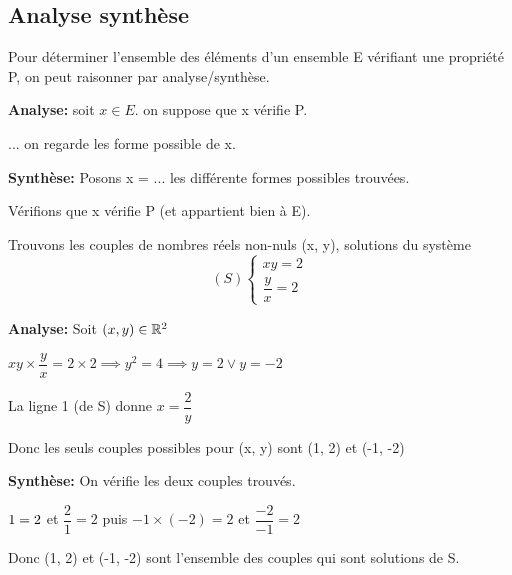 \documentclass[a4paper, 12pt]{article}
\begin{document}
\subsection{Analyse synthèse}

\begin{methode}
    Pour déterminer l'ensemble des éléments d'un ensemble E vérifiant une propriété P, on peut raisonner par analyse/synthèse.

    \vspace{1em}

    \item \textbf{Analyse:} soit $x \in E$. on suppose que x vérifie P.
    \item ... on regarde les forme possible de x.
    \item \textbf{Synthèse:} Posons x = ... les différente formes possibles trouvées.
    \item Vérifions que x vérifie P (et appartient bien à E).
\end{methode}

\begin{example}
    Trouvons les couples de nombres réels non-nuls (x, y), solutions du système
    \begin{equation*}
        (S)
        \begin{cases}
            xy = 2\\
            \dfrac{y}{x} = 2
        \end{cases}
    \end{equation*}

    \begin{demonstration}
        \textbf{Analyse:} Soit $(x, y) \in \mathbb{R}^2$

        $xy \times \dfrac{y}{x} = 2 \times 2 \implies y^2 = 4 \implies y = 2 \lor y = -2$

        La ligne 1 (de S) donne $x = \dfrac{2}{y}$

        Donc les seuls couples possibles pour (x, y) sont (1, 2) et (-1, -2)

        \vspace{0.5em}

        \textbf{Synthèse:} On vérifie les deux couples trouvés.

        $1 \time 2 = 2$ et $\dfrac{2}{1} = 2$
        puis $-1 \times (-2) = 2$ et $\dfrac{-2}{-1} = 2$

        \begin{rdem}
            Donc (1, 2) et (-1, -2) sont l'ensemble des couples qui sont solutions de S.
        \end{rdem}
    \end{demonstration}
\end{example}
\end{document}
